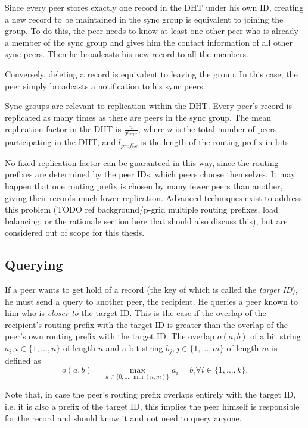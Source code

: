 Since every peer stores exactly one record in the \ac{DHT} under his own ID,
creating a new record to be maintained in the sync group is equivalent to
joining the group. To do this, the peer needs to know at least one other peer
who is already a member of the sync group and gives him the contact information
of all other sync peers. Then he broadcasts his new record to all the members.

Conversely, deleting a record is equivalent to leaving the group. In this case,
the peer simply broadcasts a notification to his sync peers.

Sync groups are relevant to replication within the \ac{DHT}. Every peer's record
is replicated as many times as there are peers in the sync group. The mean
replication factor in the \ac{DHT} is $\frac{n}{2^{l_{prefix}}}$, where $n$ is
the total number of peers participating in the \ac{DHT}, and $l_{prefix}$ is the
length of the routing prefix in bits.

No fixed replication factor can be guaranteed in this way, since the routing
prefixes are determined by the peer IDs, which peers choose themselves. It may
happen that one routing prefix is chosen by many fewer peers than another,
giving their records much lower replication. Advanced techniques exist to
address this problem (TODO ref background/p-grid multiple routing prefixes, load
balancing, or the rationale section here that should also discuss this), but are
considered out of scope for this thesis.

\subsection{Querying}
\label{sec:desc_querying}
If a peer wants to get hold of a record (the key of which is called the
\emph{target ID}), he must send a query to another peer, the recipient. He
queries a peer known to him who is \emph{closer to} the target ID. This is the
case if the overlap of the recipient's routing prefix with the target ID is
greater than the overlap of the peer's own routing prefix with the target ID.
The overlap $o(a, b)$ of a bit string $a_i, i \in \{1, \ldots, n\}$ of length
$n$ and a bit string $b_j, j \in \{1, \ldots, m\}$ of length $m$ is defined as
\[o(a, b) = \max_{k \in \{0, \ldots, \min(n, m)\}} a_i = b_i \forall i \in \{1,
\ldots, k\}.\]

Note that, in case the peer's routing prefix overlaps entirely with the target
ID, i.e. it is also a prefix of the target ID, this implies the peer himself is
responsible for the record and should know it and not need to query anyone.

